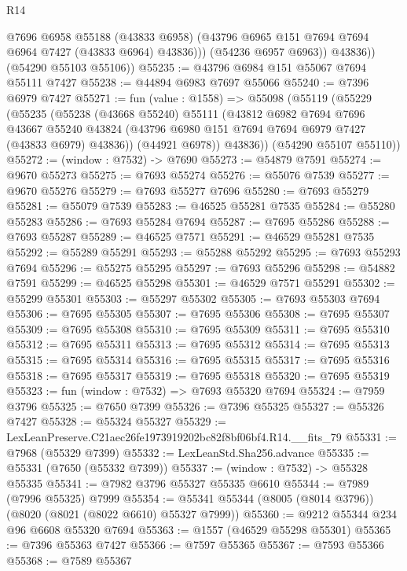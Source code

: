 \begin{lexlean}{R14}
\begin{coremodule}
                @7696
                @6958
                @55188
                (@43833 @6958)
                (@43796 @6965 @151 @7694 @7694 @6964 @7427 (@43833 @6964) @43836)))
            (@54236 @6957 @6963))
          @43836))
      (@54290 @55103 @55106))
@55235 := @43796 @6984 @151 @55067 @7694 @55111 @7427
@55238 := @44894 @6983 @7697 @55066
@55240 := @7396 @6979 @7427
@55271 := fun (value : @1558) =>
  @55098
    (@55119
      (@55229
        (@55235
          (@55238
            (@43668 @55240)
            @55111
            (@43812
              @6982
              @7694
              @7696
              @43667
              @55240
              @43824
              (@43796 @6980 @151 @7694 @7694 @6979 @7427 (@43833 @6979) @43836))
            (@44921 @6978))
          @43836))
      (@54290 @55107 @55110))
@55272 := (window : @7532) -> @7690
@55273 := @54879 @7591
@55274 := @9670 @55273
@55275 := @7693 @55274
@55276 := @55076 @7539
@55277 := @9670 @55276
@55279 := @7693 @55277 @7696
@55280 := @7693 @55279
@55281 := @55079 @7539
@55283 := @46525 @55281 @7535
@55284 := @55280 @55283
@55286 := @7693 @55284 @7694
@55287 := @7695 @55286
@55288 := @7693 @55287
@55289 := @46525 @7571
@55291 := @46529 @55281 @7535
@55292 := @55289 @55291
@55293 := @55288 @55292
@55295 := @7693 @55293 @7694
@55296 := @55275 @55295
@55297 := @7693 @55296
@55298 := @54882 @7591
@55299 := @46525 @55298
@55301 := @46529 @7571 @55291
@55302 := @55299 @55301
@55303 := @55297 @55302
@55305 := @7693 @55303 @7694
@55306 := @7695 @55305
@55307 := @7695 @55306
@55308 := @7695 @55307
@55309 := @7695 @55308
@55310 := @7695 @55309
@55311 := @7695 @55310
@55312 := @7695 @55311
@55313 := @7695 @55312
@55314 := @7695 @55313
@55315 := @7695 @55314
@55316 := @7695 @55315
@55317 := @7695 @55316
@55318 := @7695 @55317
@55319 := @7695 @55318
@55320 := @7695 @55319
@55323 := fun (window : @7532) => @7693 @55320 @7694
@55324 := @7959 @3796
@55325 := @7650 @7399
@55326 := @7396 @55325
@55327 := @55326 @7427
@55328 := @55324 @55327
@55329 := LexLeanPreserve.C21aec26fe1973919202bc82f8bf06bf4.R14.__fits_79
@55331 := @7968 (@55329 @7399)
@55332 := LexLeanStd.Sha256.advance
@55335 := @55331 (@7650 (@55332 @7399))
@55337 := (window : @7532) -> @55328 @55335
@55341 := @7982 @3796 @55327 @55335 @6610
@55344 := @7989 (@7996 @55325) @7999
@55354 := @55341 @55344 (@8005 (@8014 @3796)) (@8020 (@8021 (@8022 @6610) @55327 @7999))
@55360 := @9212 @55344 @234 @96 @6608 @55320 @7694
@55363 := @1557 (@46529 @55298 @55301)
@55365 := @7396 @55363 @7427
@55366 := @7597 @55365
@55367 := @7593 @55366
@55368 := @7589 @55367

\end{coremodule}
\end{lexlean}
